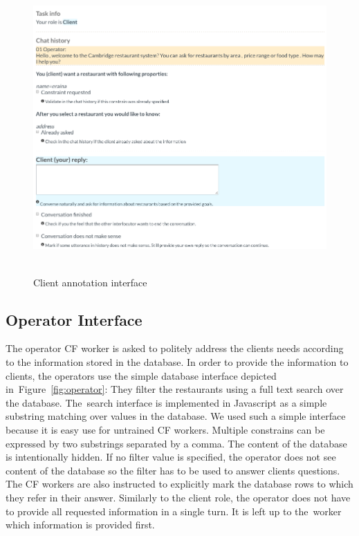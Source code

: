 \documentclass[runningheads,a4paper]{llncs}
\begin{document}
\begin{figure}[tb] %
\vspace{-1.00em}
\begin{center}
\includegraphics[height=30em]{gui-annotators-client}
\caption{Client annotation interface}
\end{center}
\vspace{-1.00em}
\label{fig:client}
\end{figure}
\vspace{-1.00em}

\vspace{-1.00em}
\subsection{Operator Interface}
\label{sec:operator}
The operator CF worker is asked to politely address the clients needs according to the information stored in the database.
In order to provide the information to clients, the operators use the simple database interface depicted in~Figure~\ref{fig:operator}:
They filter the restaurants using a full text search over the database.
The~search interface is implemented in Javascript as a simple substring matching over values in the database.
We used such a simple interface because it is easy use for untrained CF workers.
Multiple constrains can be expressed by two substrings separated by a comma.
The content of the database is intentionally hidden.
If no filter value is specified, the operator does not see content of the database so the filter has to be used to answer clients questions.
The CF workers are also instructed to explicitly mark the database rows to which they refer in their answer.
Similarly to the client role, the operator does not have to provide all requested information in a single turn.
It is left up to the~worker which information is provided first.
\end{document}

